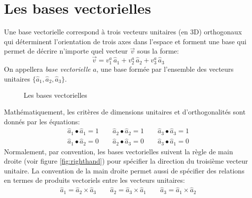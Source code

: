 \section{Les bases vectorielles}
\label{vectorbasis}
Une base vectorielle correspond à trois vecteurs unitaires (en 3D) orthogonaux qui déterminent l'orientation de trois axes dans l'espace et forment une base qui permet de décrire n'importe quel vecteur $\vec{v}$ sous la forme:
\begin{equation}
 \vec{v} = v_1^a \, \hat{a}_{1} + v_2^a \, \hat{a}_{2} + v_3^a \, \hat{a}_{3}
 \label{eq:vecbasis}
\end{equation}
On appellera \textit{base vectorielle} $a$, une base formée par l'ensemble des vecteurs unitaires $\{\hat{a}_{1},\hat{a}_{2},\hat{a}_{3}\}$.
%
\begin{figure}[htpb]
 \centering
 \hspace{10pt}
 \hspace{10pt}
 \caption{Les bases vectorielles}
 \label{fig:vecbasis}
\end{figure}

Mathématiquement, les critères de dimensions unitaires et d'orthogonalités sont donnés par les équations:
\begin{align}
 \hat{a}_{1} \bullet \hat{a}_{1} = 1 \quad\quad \hat{a}_{2} \bullet \hat{a}_{2} = 1 \quad\quad \hat{a}_{3} \bullet \hat{a}_{3} = 1
 \label{eq:unit} \\
 \hat{a}_{1} \bullet \hat{a}_{2} = 0 \quad\quad \hat{a}_{2} \bullet \hat{a}_{3} = 0 \quad\quad \hat{a}_{3} \bullet \hat{a}_{1} = 0
 \label{eq:ortho}
\end{align}
Normalement, par convention, les bases vectorielles suivent la règle de main droite (voir figure \ref{fig:righthand}) pour spécifier la direction du troisième vecteur unitaire. La convention de la main droite permet aussi de spécifier des relations en termes de produits vectoriels entre les vecteurs unitaires:
\begin{align}
 \hat{a}_{1} = \hat{a}_{2} \times \hat{a}_{3} \quad\quad \hat{a}_{2} = \hat{a}_{3} \times \hat{a}_{1} \quad\quad \hat{a}_{3} = \hat{a}_{1} \times \hat{a}_{2}
 \label{eq:righthand}
\end{align}

